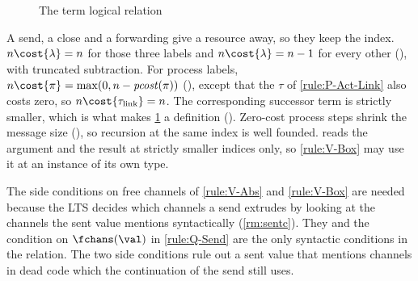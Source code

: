 \begin{figure}[tp]
  \caption{The term logical relation}
  \label{fig:logrel-rules-term}
\end{figure}

A send, a close and a forwarding give a resource away, so they keep the
index. $n \cost{\lambda} = n$ for those three labels and
$n \cost{\lambda} = n - 1$ for every other (), with
truncated subtraction. For process labels,
$n \cost{\pi} = \max(0, n - \mathit{pcost}(\pi))$ (), except that the
$\tau$ of \ref{rule:P-Act-Link} also costs zero, so
$n \cost{\tau_{\mathrm{link}}} = n$.
The corresponding successor term is strictly smaller, which is what
makes \cref{fig:logrel-rules-term} a definition ().
Zero-cost process steps shrink the message size (),
so recursion at the same index is well founded.
 reads the argument and the result at strictly smaller
indices only, so \ref{rule:V-Box} may use it at an instance of its own
type.

\begin{remark}
\label{rm:vabs}
  The side conditions on free channels of \ref{rule:V-Abs} and
  \ref{rule:V-Box} are needed because the LTS decides which channels a
  send extrudes by looking at the channels the sent value mentions
  syntactically (\cref{rm:sentc}). They and the condition on
  $\fchans(\val)$ in \ref{rule:Q-Send} are the only syntactic
  conditions in the relation. The two side conditions rule out a sent value that
  mentions channels in dead code which the continuation of the send
  still uses.
\end{remark}

